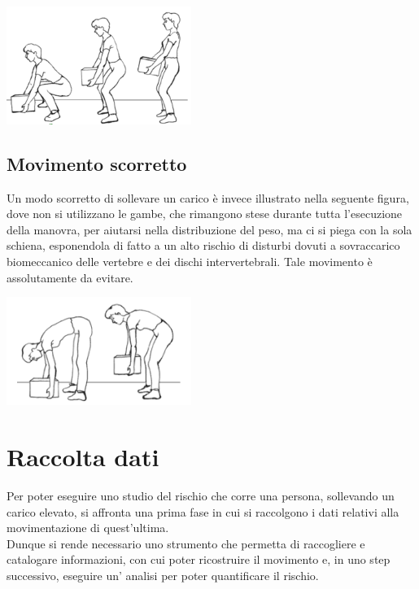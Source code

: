 \documentclass[a4paper]{article}
\begin{document}
\makebox[\linewidth]{}
\begin{center}
\begin{minipage}{0.48\linewidth}
\includegraphics[width=60mm,scale=0.7]{./images/sollevamento_corretto.png} 
\makebox[\linewidth]{}
\end{minipage}
\end{center}
\makebox[\linewidth]{}
\makebox[\linewidth]{}

\subsection{Movimento scorretto}
	Un modo scorretto di sollevare un carico è invece illustrato nella seguente figura, dove non si utilizzano le gambe, che rimangono stese durante tutta l'esecuzione della manovra, per aiutarsi nella distribuzione del peso, ma ci si piega con la sola schiena, esponendola di fatto a un alto rischio di disturbi dovuti a sovraccarico biomeccanico delle vertebre e dei dischi intervertebrali. Tale movimento è assolutamente da evitare. \\

\makebox[\linewidth]{}
\begin{center}
\begin{minipage}{0.48\linewidth}
\includegraphics[width=60mm,scale=0.7]{./images/sollevamento_scorretto.png} 
\makebox[\linewidth]{}
\end{minipage}
\end{center}




	\clearpage

	\section{Raccolta dati}
Per poter eseguire uno studio del rischio che corre una persona, sollevando un carico elevato, si affronta una prima fase in cui si raccolgono i dati relativi alla movimentazione di quest'ultima. \\
Dunque si rende necessario uno strumento che permetta di raccogliere e catalogare informazioni, con cui poter ricostruire il movimento e, in uno step successivo, eseguire un' analisi per poter quantificare il rischio. \\
\end{document}
